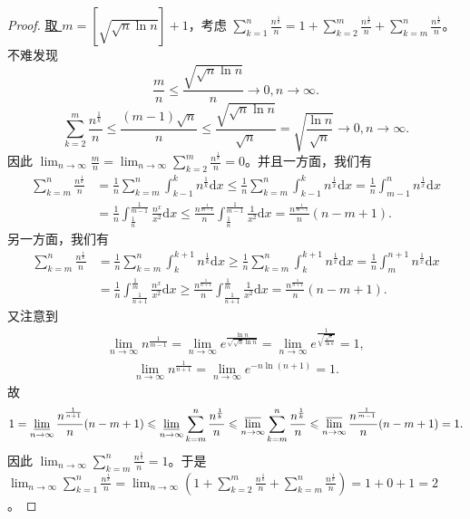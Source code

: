 \documentclass[../../main.tex]{subfiles}%
\begin{document}
\begin{proof}
\hyperlink{取m的原因}{取 \(m = [\sqrt{\sqrt{n}\ln n}]+1\)}，考虑 \(\sum\limits_{k = 1}^n\frac{n^{\frac{1}{k}}}{n}=1+\sum\limits_{k = 2}^m\frac{n^{\frac{1}{k}}}{n}+\sum\limits_{k = m}^n\frac{n^{\frac{1}{k}}}{n}\)。不难发现
\[
\frac{m}{n}\leqslant \frac{\sqrt{\sqrt{n}\ln n}}{n}\rightarrow 0,n\rightarrow \infty.
\]
\[
\sum\limits_{k = 2}^m\frac{n^{\frac{1}{k}}}{n}\leqslant \frac{(m - 1)\sqrt{n}}{n}\leqslant \frac{\sqrt{\sqrt{n}\ln n}}{\sqrt{n}}=\sqrt{\frac{\ln n}{\sqrt{n}}}\rightarrow 0,n\rightarrow \infty.
\]
因此 \(\lim_{n\rightarrow \infty}\frac{m}{n}=\lim_{n\rightarrow \infty}\sum\limits_{k = 2}^m\frac{n^{\frac{1}{k}}}{n}=0\)。并且一方面，我们有
\begin{align*}
\sum\limits_{k=m}^n{\frac{n^{\frac{1}{k}}}{n}}&=\frac{1}{n}\sum\limits_{k=m}^n{\int_{k-1}^k{n^{\frac{1}{k}}\mathrm{d}x}}\leqslant \frac{1}{n}\sum\limits_{k=m}^n{\int_{k-1}^k{n^{\frac{1}{x}}\mathrm{d}x}}=\frac{1}{n}\int_{m-1}^n{n^{\frac{1}{x}}\mathrm{d}x}
\\
&=\frac{1}{n}\int_{\frac{1}{n}}^{\frac{1}{m-1}}{\frac{n^x}{x^2}\mathrm{d}x}\leqslant \frac{n^{\frac{1}{m-1}}}{n}\int_{\frac{1}{n}}^{\frac{1}{m-1}}{\frac{1}{x^2}\mathrm{d}x}=\frac{n^{\frac{1}{m-1}}}{n}\left( n-m+1 \right) .
\end{align*}
另一方面，我们有
\begin{align*}
\sum\limits_{k=m}^n{\frac{n^{\frac{1}{k}}}{n}}&=\frac{1}{n}\sum\limits_{k=m}^n{\int_k^{k+1}{n^{\frac{1}{k}}\mathrm{d}x}}\geqslant \frac{1}{n}\sum\limits_{k=m}^n{\int_k^{k+1}{n^{\frac{1}{x}}\mathrm{d}x}}=\frac{1}{n}\int_m^{n+1}{n^{\frac{1}{x}}\mathrm{d}x}
\\
&=\frac{1}{n}\int_{\frac{1}{n+1}}^{\frac{1}{m}}{\frac{n^x}{x^2}\mathrm{d}x}\geqslant \frac{n^{\frac{1}{n+1}}}{n}\int_{\frac{1}{n+1}}^{\frac{1}{m}}{\frac{1}{x^2}\mathrm{d}x}=\frac{n^{\frac{1}{n+1}}}{n}\left( n-m+1 \right) .
\end{align*}
又注意到
\begin{align*}
\lim_{n\rightarrow \infty}n^{\frac{1}{m - 1}}=\lim_{n\rightarrow \infty}e^{\frac{\ln n}{\sqrt{\sqrt{n}\ln n}}}
=\lim_{n\rightarrow \infty}e^{\frac{1}{\sqrt{\frac{\sqrt{n}}{\ln n}}}}
=1,
\end{align*}
\begin{align*}
\lim_{n\rightarrow \infty} n^{\frac{1}{n+1}}=\lim_{n\rightarrow \infty} e^{-n\ln \left( n+1 \right)}=1.
\end{align*}
故
\[
1=\varliminf_{n\rightarrow \infty}\frac{n^{\frac{1}{n+1}}}{n}(n - m + 1)\leqslant \varliminf_{n\rightarrow \infty}\sum\limits_{k = m}^n\frac{n^{\frac{1}{k}}}{n}\leqslant \varlimsup_{n\rightarrow \infty}\sum\limits_{k = m}^n\frac{n^{\frac{1}{k}}}{n}\leqslant \varlimsup_{n\rightarrow \infty}\frac{n^{\frac{1}{m - 1}}}{n}(n - m + 1)=1.
\]
因此 \(\lim_{n\rightarrow \infty}\sum\limits_{k = m}^n\frac{n^{\frac{1}{k}}}{n}=1\)。于是 \(\lim_{n\rightarrow \infty}\sum\limits_{k = 1}^n\frac{n^{\frac{1}{k}}}{n}=\lim_{n\rightarrow \infty}\left(1+\sum\limits_{k = 2}^m\frac{n^{\frac{1}{k}}}{n}+\sum\limits_{k = m}^n\frac{n^{\frac{1}{k}}}{n}\right)=1 + 0+1 = 2\)。
\end{proof}
\end{document}
